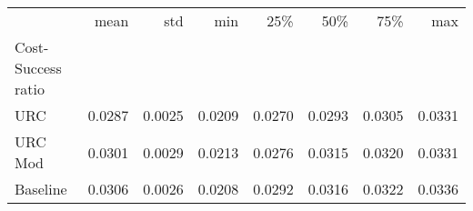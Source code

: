 \begin{tabular}{lrrrrrrr}
\toprule
 & mean & std & min & 25\% & 50\% & 75\% & max \\
Cost-Success ratio &  &  &  &  &  &  &  \\
\midrule
URC & 0.0287 & 0.0025 & 0.0209 & 0.0270 & 0.0293 & 0.0305 & 0.0331 \\
URC Mod & 0.0301 & 0.0029 & 0.0213 & 0.0276 & 0.0315 & 0.0320 & 0.0331 \\
Baseline & 0.0306 & 0.0026 & 0.0208 & 0.0292 & 0.0316 & 0.0322 & 0.0336 \\
\bottomrule
\end{tabular}
